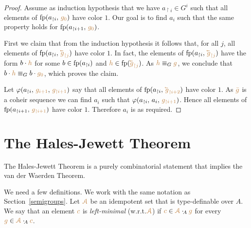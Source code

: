 \documentclass[creche.tex]{subfiles}
\begin{document}
\begin{proof}
Assume as induction hypothesis that we have $a_{\restriction i}\in G^i$ 
such that all elements of ${\rm fp}(a_{\restriction i},\,{\color{brown} g_0})$ have color $1$.
Our goal is to find $a_i$ 
such that the same property holds for ${\rm fp}(a_{\restriction i+1},\,{\color{brown} g_0})$.


First we claim that from the induction hypothesis it follows that, 
for all $j$, all elements of $\fp(a_{\restriction i},\,{\mr\cev{g}_{\restriction j}})$ have color $1$.
In fact, the elements of $\fp(a_{\restriction i},\,{\mr\cev{g}_{\restriction j}})$ have the form 
$b\cdot{\color{brown}h}$ for some $b\in{\rm fp}(a_{\restriction i})$ and ${\mr h}\in\fp({\mr\cev{g}_{\restriction j}})$.
As ${\color{brown} h}\equiv_G{\color{brown} g}$, we conclude that $b\cdot{\color{brown}h}\equiv_Gb\cdot {\color{brown}g_0}$, which proves the claim.

Let $\varphi(a_{\restriction i},\,{\color{brown} g_{i+1}},\,{\color{brown} g_{\restriction i+1}})$ 
say that all elements of $\fp(a_{\restriction i},\,{\mr\cev{g}_{\restriction i+2}})$ have color $1$.
As ${\color{brown}\bar g}$ is a coheir sequence we can find  $a_i$ 
such that $\varphi(a_{\restriction i},\,a_i,\,{\color{brown} g_{\restriction i+1}})$.
Hence all elements of ${\rm fp}(a_{\restriction i+1},\,{\color{brown} g_{\restriction i+1}})$ have color $1$.
Therefore $a_i$ is as required.
\end{proof}

\section{The Hales-Jewett Theorem}
\label{HJ}


The Hales-Jewett Theorem is a purely combinatorial statement 
that implies the van der Waerden Theorem.


We need a few definitions.
We work with the same notation as Section~\ref{semigroups}.
Let ${\color{brown}{\EuScript A}}$ be an idempotent set that is type-definable over $A$.
We say that an element ${\color{brown} c}$ is \emph{left-minimal\/} (w.r.t.\@ ${\color{brown}{\EuScript A}}$) if 
${\color{brown} c}\in{\color{brown}{\EuScript A}}\cdot_{\!A}{\color{brown} g}$ for every ${\color{brown} g}\in{\color{brown}{\EuScript A}}\cdot_{\!A}{\color{brown} c}$.
\end{document}
